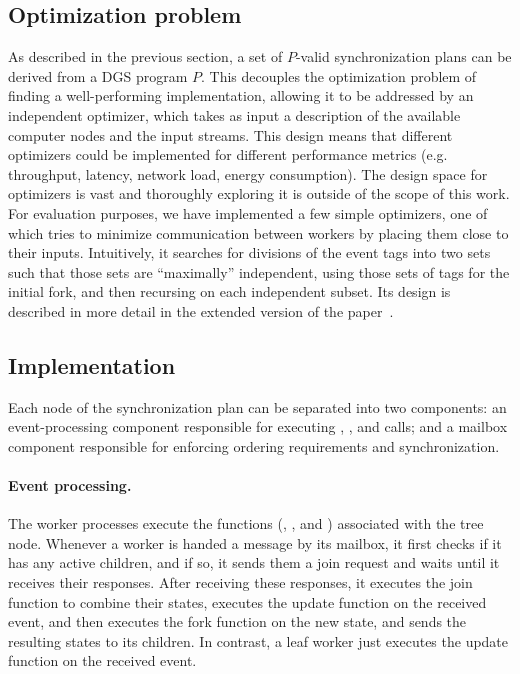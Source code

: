 \subsection{Optimization problem}
\label{dgs:ssec:optimization-problem}

As described in the previous section, a set of $P$-valid synchronization
plans can be derived from a DGS program $P$. This decouples
the optimization problem of finding a well-performing implementation,
allowing it to be addressed by an independent optimizer,
which takes as input a
description of the available computer nodes and the input streams. This
design means that different optimizers could be implemented for
different performance metrics (e.g. throughput, latency, network load,
energy consumption).
The design space for optimizers is vast and thoroughly exploring it is outside of the scope of this work. For evaluation purposes, we have implemented a few simple optimizers, one of which tries to minimize communication between workers by placing them close to their inputs. Intuitively, it searches for divisions of the event tags into two sets such that those sets are ``maximally'' independent, using those sets of tags for the initial fork, and then recursing on each independent subset.
Its design is described in more detail in the extended version of the paper~.

\subsection{Implementation}
\label{dgs:ssec:runtime}

Each node of the synchronization plan can be separated into two
components: an event-processing component
responsible for
executing ,
, and  calls; and a mailbox
component responsible for enforcing ordering requirements and
synchronization.

\paragraph{Event processing.}
The worker processes execute the functions (,
, and ) associated
with the tree node.  Whenever a worker is handed a message
by its mailbox, it first checks if it has any active children, and if
so, it sends them a join request and waits until it receives their
responses. After receiving these responses, it executes the join
function to combine their states, executes the update function on the
received event, and then executes the fork function on the new state,
and sends the resulting states to its children. In contrast, a leaf
worker just executes the update function on the received
event.


